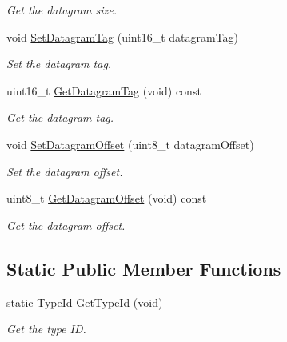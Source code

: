 \begin{DoxyCompactItemize}
\begin{DoxyCompactList}\small\item\em Get the datagram size. \end{DoxyCompactList}\item 
void \hyperlink{classns3_1_1SixLowPanFragN_a82dc6e069e6aafd902ef9382fdc9579e}{Set\+Datagram\+Tag} (uint16\+\_\+t datagram\+Tag)
\begin{DoxyCompactList}\small\item\em Set the datagram tag. \end{DoxyCompactList}\item 
uint16\+\_\+t \hyperlink{classns3_1_1SixLowPanFragN_a7bf9a8a5da112cbfafeb59461636d6e4}{Get\+Datagram\+Tag} (void) const 
\begin{DoxyCompactList}\small\item\em Get the datagram tag. \end{DoxyCompactList}\item 
void \hyperlink{classns3_1_1SixLowPanFragN_aa74eb5f6bdf7979dcbeff9155207a4d2}{Set\+Datagram\+Offset} (uint8\+\_\+t datagram\+Offset)
\begin{DoxyCompactList}\small\item\em Set the datagram offset. \end{DoxyCompactList}\item 
uint8\+\_\+t \hyperlink{classns3_1_1SixLowPanFragN_ad26431f1db66a5801bb08c041370f63a}{Get\+Datagram\+Offset} (void) const 
\begin{DoxyCompactList}\small\item\em Get the datagram offset. \end{DoxyCompactList}\end{DoxyCompactItemize}
\subsection*{Static Public Member Functions}
\begin{DoxyCompactItemize}
\item 
static \hyperlink{classns3_1_1TypeId}{Type\+Id} \hyperlink{classns3_1_1SixLowPanFragN_a0e060532742fbb856ac019f0af2b6cbf}{Get\+Type\+Id} (void)
\begin{DoxyCompactList}\small\item\em Get the type ID. \end{DoxyCompactList}\end{DoxyCompactItemize}
